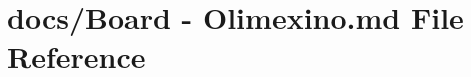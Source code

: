 \hypertarget{Board_01-_01Olimexino_8md}{\section{docs/\+Board -\/ Olimexino.\+md File Reference}
\label{Board_01-_01Olimexino_8md}
}
